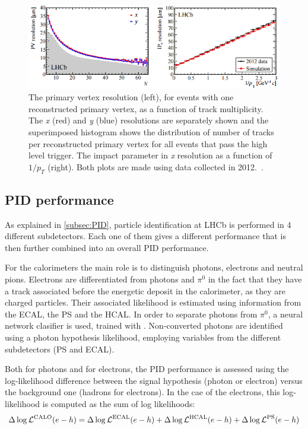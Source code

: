 \begin{figure} [htb!]
\begin{center}
\includegraphics[scale=1.0]{figs/PV_IP.png}
\caption{The primary vertex resolution (left), for events with one reconstructed primary vertex, as a function of track multiplicity. The \textit{x} (red) and \textit{y} (blue) resolutions are separately shown and the superimposed histogram shows the distribution of number of tracks per reconstructed primary vertex for all events that pass the high level trigger. The impact parameter in \textit{x} resolution as a function of $1/p_T$ (right). Both plots are made using data collected in 2012.~\cite{Aaij:2014jba}.\label{fig:lhcb_PV_IP}}
\end{center}
\end{figure}

\subsection{PID performance} %
\label{sec:PIDPerformance}
As explained in \ref{subsec:PID}, particle identification at LHCb is performed in 4 different subdetectors. Each one of them gives a different performance that is then further combined into an overall PID performance. 

For the calorimeters the main role is to distinguish photons, electrons and neutral pions. Electrons are differentiated from photons and $\pi^0$ in the fact that they have a track associated before the energetic deposit in the calorimeter, as they are charged particles. Their associated likelihood is estimated using information from the ECAL, the PS and the HCAL. 
In order to separate photons from $\pi^0$, a neural network clasifier is used, trained with . Non-converted photons are identified using a photon hypothesis likelihood, employing variables from the different subdetectors (PS and ECAL). %

Both for photons and for electrons, the PID performance is assessed using the log-likelihood difference between the signal hypothesis (photon or electron) versus the background one (hadrons for electrons). In the cae of the electrons, this log-likelihood is computed as the sum of log likelihoods:
\begin{equation}
\Delta \log{\mathcal{L}^{\rm CALO}(e-h)} = \Delta \log{\mathcal{L}^{\rm ECAL}(e-h)} + \Delta \log{\mathcal{L}^{\rm HCAL}(e-h)} + \Delta \log{\mathcal{L}^{\rm PS}(e-h)} 
\end{equation}

